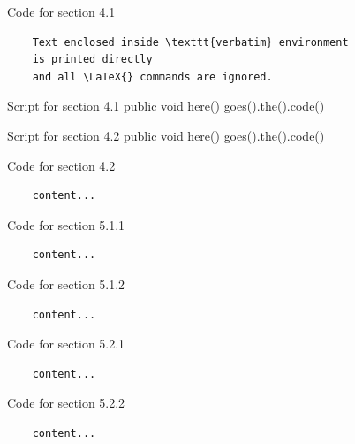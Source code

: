 \documentclass[a4paper]{article}
\begin{document}
\begin{appendices}
	Code for section 4.1
	\begin{verbatim}
	Text enclosed inside \texttt{verbatim} environment 
	is printed directly 
	and all \LaTeX{} commands are ignored.
	\end{verbatim}
	\begin{sexylisting}[colback=white]{Script for section 4.1}
public void here() {
goes().the().code()
		}
	\end{sexylisting}
	
	\begin{sexylisting}[colback=white]{Script for section 4.2}
public void here() {
goes().the().code()
		}
	\end{sexylisting}

	Code for section 4.2
	\begin{verbatim}
	content...
	\end{verbatim}
	Code for section 5.1.1
	\begin{verbatim}
	content...
	\end{verbatim}
	Code for section 5.1.2
	\begin{verbatim}
	content...
	\end{verbatim}
	Code for section 5.2.1
	\begin{verbatim}
	content...
	\end{verbatim}
	Code for section 5.2.2
	\begin{verbatim}
	content...
	\end{verbatim}
	
\end{appendices}
\end{document}
